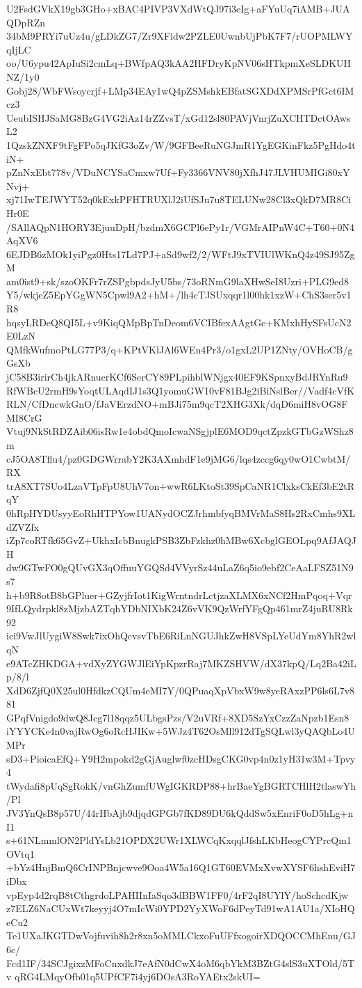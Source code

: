 U2FsdGVkX19gb3GHo+xBAC4PIVP3VXdWtQJ97i3eIg+aFYuUq7iAMB+JUAQDpRZn
34bM9PRYi7uUz4u/gLDkZG7/Zr9XFidw2PZLE0UwnbUjPbK7F7/rUOPMLWYqIjLC
oo/U6ypu42ApIuSi2cmLq+BWfpAQ3kAA2HFDryKpNV06sHTkpmXeSLDKUHNZ/1y0
Gobj28/WbFWsoycrjf+LMp34EAy1wQ4pZSMshkEBfatSGXDdXPMSrPfGct6IMcz3
UeubISHJSaMG8BzG4VG2iAz14rZZvsT/xGd12sl80PAVjVnrjZuXCHTDctOAwsL2
1QzskZNXF9tFgFPo5qJKfG3oZv/W/9GFBeeRuNGJmR1YgEGKinFkz5PgHdo4tiN+
pZnNxEbt778v/VDuNCYSaCmxw7Uf+Fy3366VNV80jXfhJ47JLVHUMIGi80xYNvj+
xj71IwTEJWYT52q0kExkPFHTRUXlJ2iUfSJu7u8TELUNw28Cl3xQkD7MR8CiHr0E
/SAllAQpN1HORY3EjuuDpH/bzdmX6GCPl6ePy1r/VGMrAIPnW4C+T60+0N4AqXV6
6EJDB6zMOk1yiPgz0Hts17Ld7PJ+aSd9wf2/2/WFtJ9xTVIUlWKnQ4z49SJ95ZgM
am0ist9+sk/szoOKFr7rZSPgbpdsJyU5bs/73oRNmG9laXHwSeI8Uzri+PLG9ed8
Y5/wkjeZ5EpYGgWN5Cpwl9A2+hM+/lh4cTJSUxqqr1l00hk1xzW+ChS3ser5v1R8
hqsyLRDeQ8QI5L+v9KiqQMpBpTnDeom6VCIBfexAAgtGc+KMxhHySFsUcN2E0LzN
QMfkWufmoPtLG77P3/q+KPtVKlJAl6WEn4Pr3/o1gxL2UP1ZNty/OVHoCB/gGsXb
jC58B3irirCh4jkARnucrKCf6SerCY89PLpihblWNjgx40EF9KSpnxyBdJRYnRu9
RfWBcU2rmH9sYoqtULAqdIJ1s3Q1yomuGW10vF81BJg2iBiNslBer//Vadf4cVfK
RLN/CfDncwkGnO/fJaVErzdNO+mBJi75m9qcT2XHG3Xk/dqD6miH8vOG8FMI8CrG
Vtuj9NkStRDZAib06isRw1e4obdQmoIcwaNSgjplE6MOD9qctZpzkGTbGzWShz8m
cJ5OA8Tflu4/pz0GDGWrrabY2K3AXmhdF1e9jMG6/lqs4zccg6qy0wO1CwbtM/RX
trA8XT7SUo4LzaVTpFpU8UhV7on+wwR6LKtoSt39SpCaNR1ClxksCkEf3bE2tRqY
0hRpHYDUsyyEoRhHTPYow1UANydOCZJrhmbfyqBMVrMaS8Hs2RxCmhs9XLdZVZfx
iZp7coRTfk65GvZ+UkhxIcbBnugkPSB3ZbFzkhz0hMBw6XcbglGEOLpq9AfJAQJH
dw9GTwFO0gQUvGX3qOffuuYGQSd4VVyrSz44uLaZ6q5io9ebf2CeAaLFSZ51N9s7
h+b9R8otB8bGPluer+GZyjfrIot1KigWrntndrLctjzaXLMX6xNCf2HmPqoq+Vqr
9IfLQydrpkl8zMjzbAZTqhYDbNIXbK24Z6vVK9QzWrfYFgQp461mrZ4juRU8Rk92
ici9VwJlUygiW8Swk7ixOhQcvsvTbE6RiLnNGUJhkZwH8VSpLYeUdYm8YhR2wlqN
e9ATcZHKDGA+vdXyZYGWJlEiYpKpzrRaj7MKZSHVW/dX37kpQ/Lq2Ba42iLp/8/l
XdD6ZjfQ0X25ul0HfdkzCQUm4eMI7Y/0QPuaqXpVbxW9w8yeRAxzPP6ls6L7v881
GPqfVnigdo9dwQ8Jcg7l18qqz5ULbgsPzs/V2uVRf+8XD5SzYxCzzZaNpzb1Esn8
iYYYCKe4n0vajRwOg6oRcHJIKw+5WJz4T62OsMll912dTgSQLwl3yQAQbLo4UMPr
sD3+PioicaEfQ+Y9H2mpokd2gGjAuglwf0zcHDsgCKG0vp4n0z1yH31w3M+Tpvy4
tWydafi8pUqSgRokK/vnGhZumfUWgIGKRDP88+hrBaeYgBGRTCHlH2tlaswYh/Pl
JV3YnQsB8p57U/44rHbAjb9djqdGPGb7fKD89DU6kQddSw5xEnriF0oD5hLg+nI1
s+61NLmmlON2PldYsLb21OPDX2UWr1XLWCqKxqqlJfshLKbHeogCYPrcQm1OVtq1
+bYz4HnjBmQ6CrINPBnjcwve9Ooa4W5a16Q1GT60EVMxXvwXYSF6hshEviH7iDbx
vpEyp4d2rqB8tCthgrdoLPAHIInIaSqo3dBBW1FF0/4rF2qI8UYlY/hoSchcdKjw
z7ELZ6NaCUxWt7keyyj4O7mIcWi0YPD2YyXWoF6dPeyTd91wA1AU1a/XIoHQeCu2
Te1UXaJKGTDwVojfuvih8h2r8xn5oMMLCkxoFuUFfxogoirXDQOCCMhEnu/GJ6c/
Fcd1IF/34SCJgixzMFoCnxdkJ7eAfN0dCwX4oM6qbYkM3BZtG4slS3uXTOld/5Tv
qRG4LMqyOfb01q5UPfCF7i4yj6DOsA3RoYAEtx2skUI=
